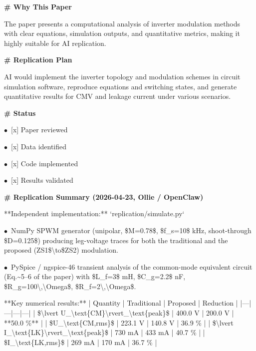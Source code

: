 \documentclass[11pt]{article}
\begin{document}
\par\medskip\textbf{\# Why This Paper}\par
The paper presents a computational analysis of inverter modulation methods with clear equations, simulation outputs, and quantitative metrics, making it highly suitable for AI replication.

\par\medskip\textbf{\# Replication Plan}\par
AI would implement the inverter topology and modulation schemes in circuit simulation software, reproduce equations and switching states, and generate quantitative results for CMV and leakage current under various scenarios.

\par\medskip\textbf{\# Status}\par
\par$\bullet$\ [x] Paper reviewed
\par$\bullet$\ [x] Data identified
\par$\bullet$\ [x] Code implemented
\par$\bullet$\ [x] Results validated

\par\medskip\textbf{\# Replication Summary (2026-04-23, Ollie / OpenClaw)}\par

**Independent implementation:** `replication/simulate.py`
\par$\bullet$\ NumPy SPWM generator (unipolar, \$M=0.78\$, \$f\_s=10\$ kHz, shoot-through \$D=0.125\$) producing leg-voltage traces for both the traditional and the proposed (ZS1\$\textbackslash{}to\$ZS2) modulation.
\par$\bullet$\ PySpice / ngspice-46 transient analysis of the common-mode equivalent circuit (Eq.\textasciitilde{}5–6 of the paper) with \$L\_f=3\$ mH, \$C\_g=2.2\$ nF, \$R\_g=100\textbackslash{},\textbackslash{}Omega\$, \$R\_f=2\textbackslash{},\textbackslash{}Omega\$.

**Key numerical results:**
| Quantity | Traditional | Proposed | Reduction |
|---|---|---|---|
| \$\textbackslash{}lvert U\_\textbackslash{}text\{CM\}\textbackslash{}rvert\_\textbackslash{}text\{peak\}\$ | 400.0 V | 200.0 V | **50.0 \%** |
| \$U\_\textbackslash{}text\{CM,rms\}\$ | 223.1 V | 140.8 V | 36.9 \% |
| \$\textbackslash{}lvert I\_\textbackslash{}text\{LK\}\textbackslash{}rvert\_\textbackslash{}text\{peak\}\$ | 730 mA | 433 mA | 40.7 \% |
| \$I\_\textbackslash{}text\{LK,rms\}\$ | 269 mA | 170 mA | 36.7 \% |
\end{document}
